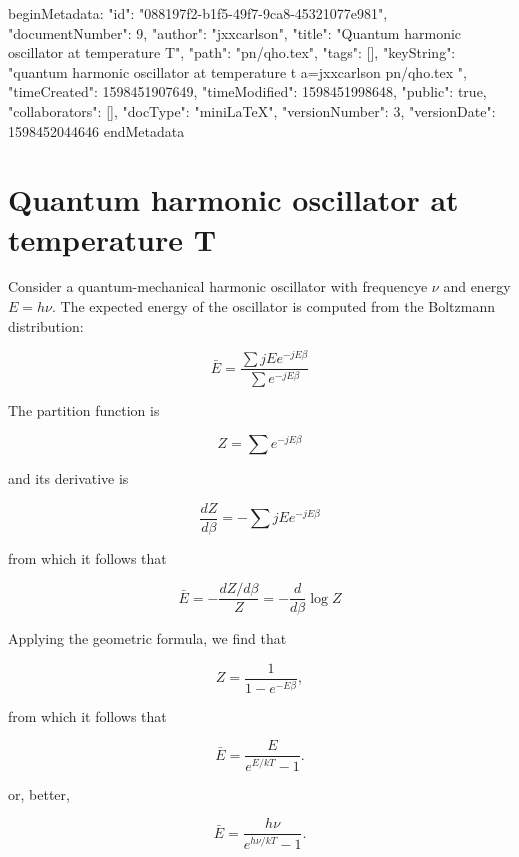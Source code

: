 beginMetadata:
{
    "id": "088197f2-b1f5-49f7-9ca8-45321077e981",
    "documentNumber": 9,
    "author": "jxxcarlson",
    "title": "Quantum harmonic oscillator at temperature T",
    "path": "pn/qho.tex",
    "tags": [],
    "keyString": "quantum harmonic oscillator at temperature t a=jxxcarlson pn/qho.tex ",
    "timeCreated": 1598451907649,
    "timeModified": 1598451998648,
    "public": true,
    "collaborators": [],
    "docType": "miniLaTeX",
    "versionNumber": 3,
    "versionDate": 1598452044646
}
endMetadata

\section{Quantum harmonic oscillator at temperature T}

Consider a quantum-mechanical harmonic oscillator with frequencye $\nu$ and energy $E = h\nu$.  The expected energy of the oscillator is computed from the Boltzmann distribution:

\begin{equation}
\bar{E} = \frac{\sum jE e^{-jE\beta}}{\sum e^{-jE\beta}}
\end{equation}

The partition function is

\begin{equation}
Z = \sum e^{-jE\beta}
\end{equation}

and its derivative is


\begin{equation}
\frac{dZ}{d\beta} =  - \sum jE e^{-jE\beta}
\end{equation}

from which it follows that

\begin{equation}
\bar{E} = - \frac{dZ/d\beta}{Z} = - \frac{d}{d\beta} \log Z
\end{equation}

Applying the geometric formula, we find that

\begin{equation}
Z = \frac{1}{1 - e^{-E\beta}},
\end{equation}

from which it follows that

\begin{equation}
\bar{E} = \frac{E}{e^{E/kT} - 1}.
\end{equation}


or, better,


\begin{equation}
\bar{E} = \frac{h\nu}{e^{h\nu/kT} - 1}.
\end{equation}

